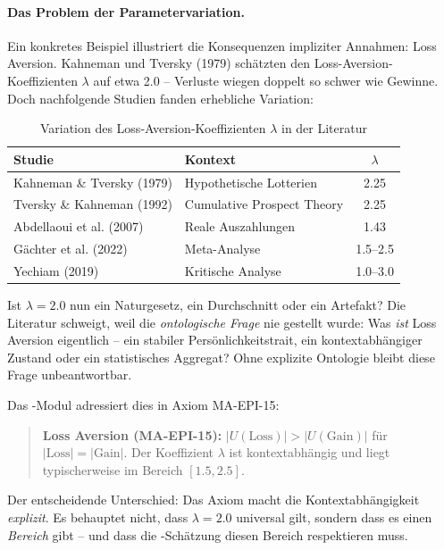 \paragraph{Das Problem der Parametervariation.}

Ein konkretes Beispiel illustriert die Konsequenzen impliziter Annahmen: Loss Aversion. Kahneman und Tversky (1979) schätzten den Loss-Aversion-Koeffizienten $\lambda$ auf etwa 2.0 -- Verluste wiegen doppelt so schwer wie Gewinne. Doch nachfolgende Studien fanden erhebliche Variation:

\begin{table}[h]
\centering
\caption{Variation des Loss-Aversion-Koeffizienten $\lambda$ in der Literatur}
\begin{tabular}{@{}llc@{}}
\toprule
\textbf{Studie} & \textbf{Kontext} & \textbf{$\lambda$} \\
\midrule
Kahneman \& Tversky (1979) & Hypothetische Lotterien & 2.25 \\
Tversky \& Kahneman (1992) & Cumulative Prospect Theory & 2.25 \\
Abdellaoui et al. (2007) & Reale Auszahlungen & 1.43 \\
Gächter et al. (2022) & Meta-Analyse & 1.5--2.5 \\
Yechiam (2019) & Kritische Analyse & 1.0--3.0 \\
\bottomrule
\end{tabular}
\end{table}

Ist $\lambda = 2.0$ nun ein Naturgesetz, ein Durchschnitt oder ein Artefakt? Die Literatur schweigt, weil die \textit{ontologische Frage} nie gestellt wurde: Was \textit{ist} Loss Aversion eigentlich -- ein stabiler Persönlichkeitstrait, ein kontextabhängiger Zustand oder ein statistisches Aggregat? Ohne explizite Ontologie bleibt diese Frage unbeantwortbar.

Das \META-Modul adressiert dies in Axiom MA-EPI-15:

\begin{quote}
\textbf{Loss Aversion (MA-EPI-15):} $|U(\text{Loss})| > |U(\text{Gain})|$ für $|\text{Loss}| = |\text{Gain}|$. Der Koeffizient $\lambda$ ist kontextabhängig und liegt typischerweise im Bereich $[1.5, 2.5]$.
\end{quote}

Der entscheidende Unterschied: Das Axiom macht die Kontextabhängigkeit \textit{explizit}. Es behauptet nicht, dass $\lambda = 2.0$ universal gilt, sondern dass es einen \textit{Bereich} gibt -- und dass die \BEATRIX-Schätzung diesen Bereich respektieren muss.

